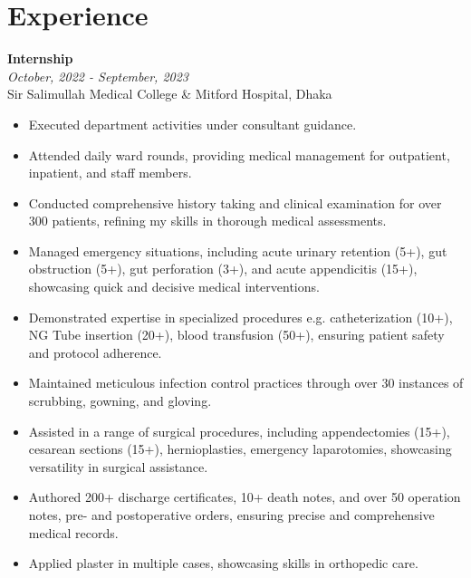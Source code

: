 \documentclass[a4paper,12pt]{article}
\newcommand{\resumeentry}[2]{
    \textbf{#1} \\
    \textit{#2}
}
\begin{document}
\begin{minipage}[t][15cm]{\textwidth}
\section*{Experience}
\resumeentry{Internship}{October, 2022 - September, 2023}\\ Sir Salimullah Medical College \& Mitford Hospital, Dhaka 
\begin{itemize}[left=1em, itemsep=0pt, parsep=0pt]
	\item Executed department activities under consultant guidance.
	\item Attended daily ward rounds, providing medical management for outpatient, inpatient, and staff members.
	\item Conducted comprehensive history taking and clinical examination for over 300 patients, refining my skills in thorough medical assessments.
	\item Managed emergency situations, including acute urinary retention (5+), gut obstruction (5+), gut perforation (3+), and acute appendicitis (15+), showcasing quick and decisive medical interventions.
	\item Demonstrated expertise in specialized procedures e.g. catheterization (10+), NG Tube insertion (20+), blood transfusion (50+), ensuring patient safety and protocol adherence.
	\item Maintained meticulous infection control practices through over 30 instances of scrubbing, gowning, and gloving.
	\item Assisted in a range of surgical procedures, including appendectomies (15+), cesarean sections (15+), hernioplasties, emergency laparotomies, showcasing versatility in surgical assistance.
	\item Authored 200+ discharge certificates, 10+ death notes, and over 50 operation notes, pre- and postoperative orders, ensuring precise and comprehensive medical records.
	\item Applied plaster in multiple cases, showcasing skills in orthopedic care.
\end{itemize}
\end{minipage}
\newpage
\end{document}
